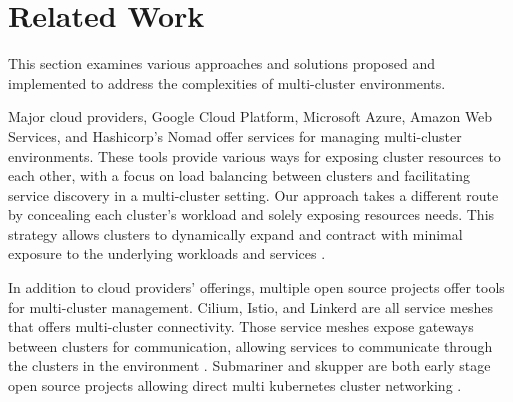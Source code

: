 
\chapter{Related Work}

%
%
%
%
%
%
%
%
%
%
%
%
This section examines various approaches and solutions proposed and implemented
to address the complexities of multi-cluster environments.

Major cloud providers, Google Cloud Platform, Microsoft Azure, Amazon Web
Services, and Hashicorp's Nomad offer services for managing multi-cluster
environments. These tools provide various ways for exposing cluster resources
to each other, with a focus on load balancing between clusters and facilitating
service discovery in a multi-cluster setting. Our approach takes a different
route by concealing each cluster's workload and solely exposing resources
needs. This strategy allows clusters to dynamically expand and contract with
minimal exposure to the underlying workloads and services \cite{noauthor_fleet_nodate, noauthor_azure_nodate, noauthor_multi-region_nodate}.

In addition to cloud providers' offerings, multiple open source projects offer
tools for multi-cluster management. Cilium, Istio, and Linkerd are all service
meshes that offers multi-cluster connectivity. Those service meshes expose
gateways between clusters for communication, allowing services to communicate
through the clusters in the environment \cite{noauthor_cluster_nodate,
noauthor_multi-cluster_nodate-2, noauthor_install_nodate}. Submariner and
skupper are both early stage open source projects allowing direct multi
kubernetes cluster networking \cite{noauthor__nodate, noauthor_skupper_nodate}. 

